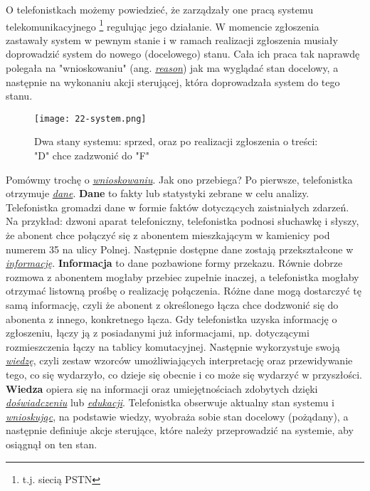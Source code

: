 O telefonistkach możemy powiedzieć, że zarządzały one pracą systemu telekomunikacyjnego \footnote{t.j. siecią PSTN} regulując jego działanie. W momencie zgłoszenia zastawały system w pewnym stanie i w ramach realizacji zgłoszenia musiały doprowadzić system do nowego (docelowego) stanu. Cała ich praca tak naprawdę polegała na "wnioskowaniu" (ang. \hyperlink{def:wnioskowanie}{\textit{reason}}) jak ma wyglądać stan docelowy, a następnie na wykonaniu akcji sterującej, która doprowadzała system do tego stanu. 

\begin{figure}[!htbp]
    \centering \texttt{[image: 22-system.png]}
    \caption{Dwa stany systemu: sprzed, oraz po realizacji zgłoszenia o treści: "D" chce zadzwonić do "F"}\label{fig:}
\end{figure}

Pomówmy trochę o \hyperlink{def:wnioskowanie}{\textit{wnioskowaniu}}. Jak ono przebiega? Po pierwsze, telefonistka otrzymuje \hyperlink{def:dane}{\textit{dane}}. \textbf{Dane} to fakty lub statystyki zebrane w celu analizy. Telefonistka gromadzi dane w formie faktów dotyczących zaistniałych zdarzeń. Na przykład: dzwoni aparat telefoniczny, telefonistka podnosi słuchawkę i słyszy, że abonent chce połączyć się z abonentem mieszkającym w kamienicy pod numerem 35 na ulicy Polnej. Następnie dostępne dane zostają przekształcone w \hyperlink{def:informacja}{\textit{informację}}. \textbf{Informacja} to dane pozbawione formy przekazu. Równie dobrze rozmowa z abonentem mogłaby przebiec zupełnie inaczej, a telefonistka mogłaby otrzymać listowną prośbę o realizację połączenia. Różne dane mogą dostarczyć tę samą informację, czyli że abonent z określonego łącza chce dodzwonić się do abonenta z innego, konkretnego łącza. Gdy telefonistka uzyska informację o zgłoszeniu, łączy ją z posiadanymi już informacjami, np. dotyczącymi rozmieszczenia łączy na tablicy komutacyjnej. Następnie wykorzystuje swoją \hyperlink{def:wiedza}{\textit{wiedzę}}, czyli zestaw wzorców umożliwiających interpretację oraz przewidywanie tego, co się wydarzyło, co dzieje się obecnie i co może się wydarzyć w przyszłości. \textbf{Wiedza} opiera się na informacji oraz umiejętnościach zdobytych dzięki \hyperlink{def:doswiadczenie}{\textit{doświadczeniu}} lub \hyperlink{def:edukacja}{\textit{edukacji}}. Telefonistka obserwuje aktualny stan systemu i \hyperlink{def:wnioskowanie}{\textit{wnioskując}}, na podstawie wiedzy, wyobraża sobie stan docelowy (pożądany), a następnie definiuje akcje sterujące, które należy przeprowadzić na systemie, aby osiągnął on ten stan.



